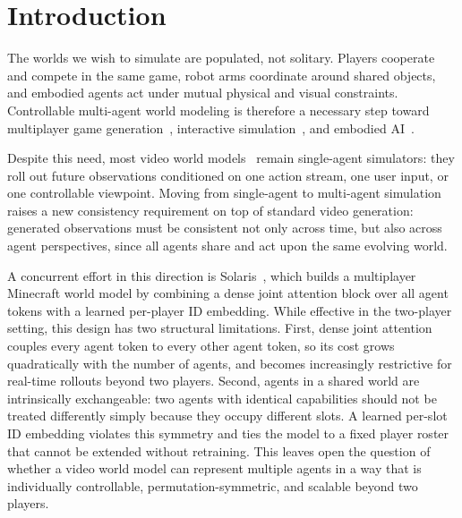 \section{Introduction}
\label{sec:introduction}

The worlds we wish to simulate are populated, not solitary.
Players cooperate and compete in the same game, robot arms coordinate around shared objects, and embodied agents act under mutual physical and visual constraints.
Controllable multi-agent world modeling is therefore a necessary step toward multiplayer game generation~\cite{bruce2024genie,savva2026solaris}, interactive simulation~\cite{ren2025cosmos-drive-dreams,ali2025world-simulation}, and embodied AI~\cite{fung2025embodied-ai-agents,feng2026multi-agent-embodied-ai}.

Despite this need, most video world models~\cite{alonso2024diffusion,valevski2024diffusion,he2025matrix,xiao2025worldmem,hyworld2025,worldplay2025,yu2025cam} remain single-agent simulators: they roll out future observations conditioned on one action stream, one user input, or one controllable viewpoint.
Moving from single-agent to multi-agent simulation raises a new consistency requirement on top of standard video generation: generated observations must be consistent not only across time, but also across agent perspectives, since all agents share and act upon the same evolving world.

A concurrent effort in this direction is Solaris~\cite{savva2026solaris}, which builds a multiplayer Minecraft world model by combining a dense joint attention block over all agent tokens with a learned per-player ID embedding.
While effective in the two-player setting, this design has two structural limitations.
First, dense joint attention couples every agent token to every other agent token, so its cost grows quadratically with the number of agents, and becomes increasingly restrictive for real-time rollouts beyond two players.
Second, agents in a shared world are intrinsically exchangeable: two agents with identical capabilities should not be treated differently simply because they occupy different slots.
A learned per-slot ID embedding violates this symmetry and ties the model to a fixed player roster that cannot be extended without retraining.
This leaves open the question of whether a video world model can represent multiple agents in a way that is individually controllable, permutation-symmetric, and scalable beyond two players.

